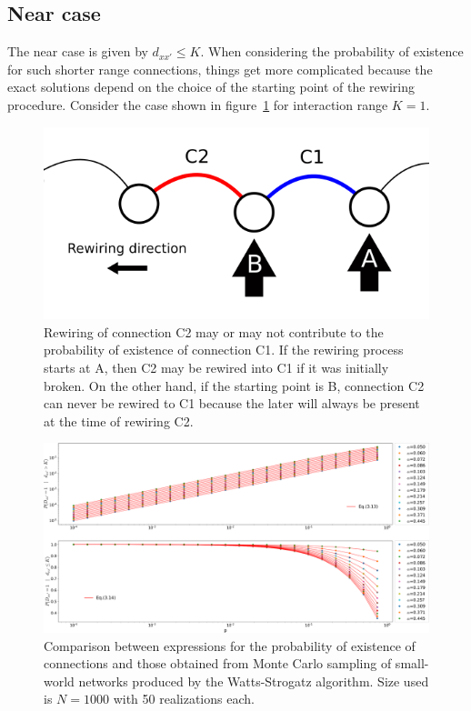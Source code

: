 \subsection{Near case}

The near case is given by $d_{xx'}\leq K$. When considering the probability of existence for such shorter range connections, things get
more complicated because the exact solutions depend on the choice of the starting point of the rewiring procedure. Consider the case
shown in figure~\ref{fig:order_dependence} for interaction range $K=1$.

\begin{figure}[!ht]
    \centering
    \includegraphics[width=0.7\linewidth]{fig/order_dependence.png}
    \caption{Rewiring of connection C2 may or may not contribute to the probability of existence of connection C1. If the rewiring
    process starts at A, then C2 may be rewired into C1 if it was initially broken. On the other hand, if the starting point is B,
    connection C2 can never be rewired to C1 because the later will always be present at the time of rewiring C2.}

    \label{fig:order_dependence}
\end{figure}

\begin{figure}
    \centering
    \includegraphics[width=\linewidth]{fig/rewire_mc.png}
    \caption{Comparison between expressions for the probability of existence of connections and those obtained from Monte Carlo
    sampling of small-world networks produced by the Watts-Strogatz algorithm. Size used is $N=1000$ with 50 realizations each.}

    \label{fig:rewire_mc}
\end{figure}

